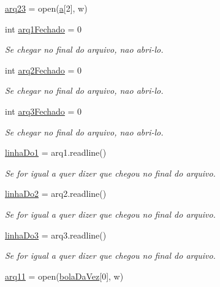 \begin{DoxyCompactItemize}
\item 
\hyperlink{namespacemain_adcb0b761002159eece56799f58375371}{arq23} = open(\hyperlink{namespacemain_aa164244f9ef98d3941710f56dae766dc}{a}\mbox{[}2\mbox{]}, \textquotesingle{}w\textquotesingle{})
\item 
int \hyperlink{namespacemain_a338ce95673b10f656d8a25a8e07d9435}{arq1\+Fechado} = 0
\begin{DoxyCompactList}\small\item\em Se chegar no final do arquivo, nao abri-\/lo. \end{DoxyCompactList}\item 
int \hyperlink{namespacemain_a5d2496a58a1981a2952832398b61fdef}{arq2\+Fechado} = 0
\begin{DoxyCompactList}\small\item\em Se chegar no final do arquivo, nao abri-\/lo. \end{DoxyCompactList}\item 
int \hyperlink{namespacemain_ac965b5f9e09d1ca878e16df935acf3a6}{arq3\+Fechado} = 0
\begin{DoxyCompactList}\small\item\em Se chegar no final do arquivo, nao abri-\/lo. \end{DoxyCompactList}\item 
\hyperlink{namespacemain_acd60c1e49534829a55f6a2658e323846}{linha\+Do1} = arq1.\+readline()
\begin{DoxyCompactList}\small\item\em Se for igual a \textquotesingle{}\textquotesingle{} quer dizer que chegou no final do arquivo. \end{DoxyCompactList}\item 
\hyperlink{namespacemain_a614c35d15ed676c2cd0f2bf8071766cf}{linha\+Do2} = arq2.\+readline()
\begin{DoxyCompactList}\small\item\em Se for igual a \textquotesingle{}\textquotesingle{} quer dizer que chegou no final do arquivo. \end{DoxyCompactList}\item 
\hyperlink{namespacemain_a6a808f2c72f7691e1ceccd6c979ed50e}{linha\+Do3} = arq3.\+readline()
\begin{DoxyCompactList}\small\item\em Se for igual a \textquotesingle{}\textquotesingle{} quer dizer que chegou no final do arquivo. \end{DoxyCompactList}\item 
\hyperlink{namespacemain_a1a1dd2c22f8dc7b2f0a4f2f59d2b19c0}{arq11} = open(\hyperlink{namespacemain_a1a062cd836b3711b8674874524bf97dc}{bola\+Da\+Vez}\mbox{[}0\mbox{]}, \textquotesingle{}w\textquotesingle{})

\end{DoxyCompactItemize}
